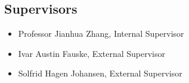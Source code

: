 \subsection{Supervisors}
\begin{itemize}
	\item[] Professor Jianhua Zhang, Internal Supervisor
	\item[] Ivar Austin Fauske, External Supervisor
	\item[] Solfrid Hagen Johansen, External Supervisor
\end{itemize}